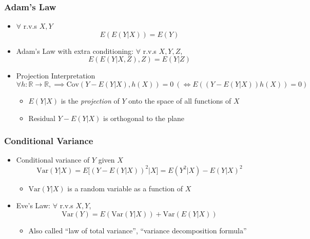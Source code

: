 \subsubsection*{Adam's Law}
\begin{itemize}
    \item $\forall$ r.v.s $X,Y$
    \begin{equation}
        E(E(Y|X))=E(Y)
    \end{equation}
    \item Adam's Law with extra conditioning: $\forall$ r.v.s $X,Y,Z$,
    \begin{equation}
        E(E(Y|X,Z),Z)=E(Y|Z)
    \end{equation}
    \item Projection Interpretation
    \begin{equation}
        \forall h:\mathbb{R}\to\mathbb{R},\implies\text{Cov}(Y-E(Y|X),h(X))=0~(\iff E((Y-E(Y|X))h(X))=0)
    \end{equation}
    \begin{itemize}
        \item $E(Y|X)$ is the \textit{projection} of $Y$ onto the space of all functions of $X$
        \item Residual $Y-E(Y|X)$ is orthogonal to the plane
    \end{itemize}
\end{itemize}

\subsubsection*{Conditional Variance}
\begin{itemize}
    \item Conditional variance of $Y$ given $X$
    \begin{equation}
        \text{Var}(Y|X)=E\Bigr[(Y-E(Y|X))^2\Bigr|X\Bigr]=E\left(Y^2|X\right)-E(Y|X)^2
    \end{equation}
    \begin{itemize}
        \item $\text{Var}(Y|X)$ is a random variable as a function of $X$
    \end{itemize}
    \item Eve's Law: $\forall$ r.v.s $X,Y$,
    \begin{equation}
        \text{Var}(Y)=E(\text{Var}(Y|X))+\text{Var}(E(Y|X))
    \end{equation}
    \begin{itemize}
        \item Also called ``law of total variance'', ``variance decomposition formula''
    \end{itemize}
\end{itemize}


